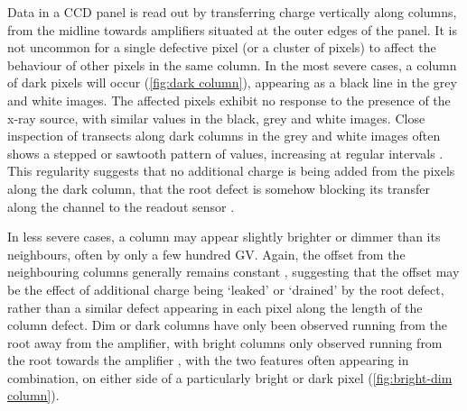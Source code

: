 \documentclass[\main/IO-Pixels.tex]{subfiles}
\begin{document}
\label{sec:column-defects}


Data in a CCD panel is read out by transferring charge vertically along columns,  from the midline towards amplifiers situated at the outer edges of the panel. It is not uncommon for a single defective pixel (or a cluster of pixels) to affect the behaviour of other pixels in the same column. In the most severe cases, a column of dark pixels will occur (\autoref{fig:dark column}), appearing as a black line in the grey and white images. The affected pixels exhibit no response to the presence of the x-ray source, with similar values in the black, grey and white images. Close inspection of transects along dark columns in the grey and white images often shows a stepped or sawtooth pattern of values, increasing at regular intervals  . This regularity suggests that no additional charge is being added from the pixels along the dark column, that the root defect is somehow blocking its transfer along the channel to the readout sensor .

In less severe cases, a column may appear slightly brighter or dimmer than its neighbours, often by only a few hundred GV. Again, the offset from the neighbouring columns generally remains constant , suggesting that the offset may be the effect of additional charge being `leaked' or `drained' by the root defect, rather than a similar defect appearing in each pixel along the length of the column defect. Dim or dark columns have only been observed running from the root away from the amplifier, with bright columns only observed running from the root towards the amplifier , with the two features often appearing in combination, on either side of a particularly bright or dark pixel (\autoref{fig:bright-dim column}).
\end{document}
